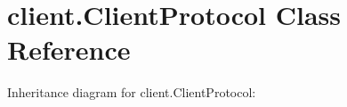 \hypertarget{classclient_1_1ClientProtocol}{}\section{client.\+Client\+Protocol Class Reference}
\label{classclient_1_1ClientProtocol}


Inheritance diagram for client.\+Client\+Protocol\+:
